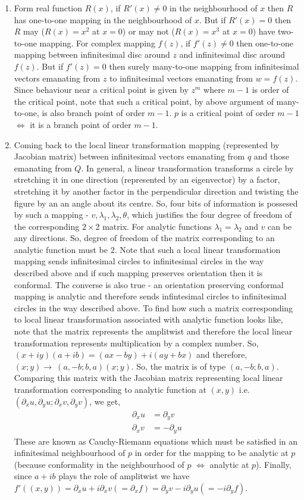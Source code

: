 \documentclass[12pt]{article}
\newcommand{\rto}{\rightarrow\ }
\begin{document}
\begin{enumerate}
    \item Form real function $R(x)$, if $R'(x)\neq 0$ in the neighbourhood of $x$ then $R$ has one-to-one mapping in the neighbourhood of $x$. But if $R'(x)=0$ then $R$ may ($R(x)=x^2$ at $x=0$) or may not ($R(x)=x^3$ at $x=0$) have two-to-one mapping. For complex mapping $f(z)$, if $f'(z) \neq 0$ then one-to-one mapping between infinitesimal disc around $z$ and infinitesimal disc around $f(z)$. But if $f'(z) = 0$ then surely many-to-one mapping from infinitesimal vectors emanating from $z$ to infinitesimal vectors emanating from $w=f(z)$. Since behaviour near a critical point is given by $z^m$ where $m-1$ is order of the critical point, note that such a critical point, by above argument of many-to-one, is also branch point of order $m-1$. $p$ is a critical point of order $m-1$ $\iff$ it is a branch point of order $m-1$.
    \item Coming back to the local linear transformation mapping (represented by Jacobian matrix) between infinitesimal vectors emanating from $q$ and those emanating from $Q$. In general, a linear transformation transforms a circle by stretching it in one direction (represented by an eigenvector) by a factor, stretching it by another factor in the perpendicular direction and twisting the figure by an an angle about its centre. So, four bits of information is possesed by such a mapping - $v,\lambda_1,\lambda_2,\theta$, which justifies the four degree of freedom of the corresponding $2\times 2$ matrix. For analytic functions $\lambda_1 = \lambda_2$ and $v$ can be any directions. So, degree of freedom of the matrix corresponding to an analytic function must be $2$. Note that such a local linear transformation mapping sends infinitesimal circles to infinitesimal circles in the way described above and if such mapping preserves orientation then it is conformal. The converse is also true - an orientation preserving conformal mapping is analytic and therefore sends infintesimal circles to infinitesimal circles in the way described above. To find how such a matrix corresponding to local linear transformation associated with analytic function looks like, note that the matrix represents the amplitwist and therefore the local linear transformation represents multiplication by a complex number. So, $(x+iy)(a+ib) = (ax-by)+i(ay+bx)$ and therefore, $(x;y)\rto (a,-b;b,a)(x;y)$. So, the matrix is of type $(a,-b;b,a)$. Comparing this matrix with the Jacobian matrix representing local linear transformation corresponding to analytic function at $(x,y)$ i.e. $(\partial_{x}u,\partial_{y}u;\partial_{x}v,\partial_{y}v)$, we get,
    \begin{align*}
        \partial_{x}u &= \partial_{y}v\\
        \partial_{x}v &= -\partial_{y}u
    \end{align*}
    These are known as Cauchy-Riemann equations which must be satisfied in an infinitesimal neighbourhood of $p$ in order for the mapping to be analytic at $p$ (because conformality in the neighbourhood of $p$ $\iff$ analytic at $p$). Finally, since $a+ib$ plays the role of amplitwist we have $f'((x,y)) = \partial_{x}u + i\partial_{x}v (=\partial_{x}f) = \partial_{y}v - i\partial_{y}u (=-i\partial_{y}f)$.
\end{enumerate}
\end{document}
